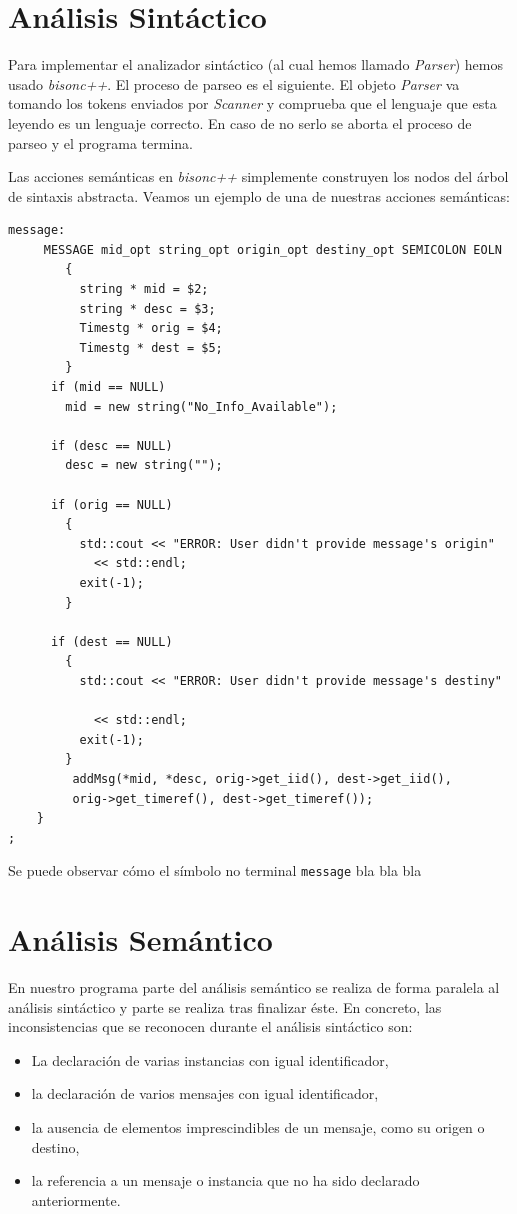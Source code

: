 \section{Análisis Sintáctico}

Para implementar el analizador sintáctico (al cual hemos llamado
\textit{Parser}) hemos usado \textit{bisonc++}. El proceso de parseo
es el siguiente. El objeto \textit{Parser} va tomando los tokens
enviados por \textit{Scanner} y comprueba que el lenguaje que esta
leyendo es un lenguaje correcto. En caso de no serlo se aborta el
proceso de parseo y el programa termina.

Las acciones semánticas en \emph{bisonc++} simplemente construyen los
nodos del árbol de sintaxis abstracta. Veamos un ejemplo de una de
nuestras acciones semánticas: 
\begin{lstlisting}
message:
     MESSAGE mid_opt string_opt origin_opt destiny_opt SEMICOLON EOLN
        { 
	      string * mid = $2;
          string * desc = $3;
          Timestg * orig = $4;
          Timestg * dest = $5;
        }
	  if (mid == NULL)
	    mid = new string("No_Info_Available");

	  if (desc == NULL)
	    desc = new string("");

	  if (orig == NULL)
	    {
	      std::cout << "ERROR: User didn't provide message's origin" 
			<< std::endl;
	      exit(-1);
	    }

	  if (dest == NULL)
	    {
	      std::cout << "ERROR: User didn't provide message's destiny" 

			<< std::endl;
	      exit(-1);
	    }
	     addMsg(*mid, *desc, orig->get_iid(), dest->get_iid(), 
		 orig->get_timeref(), dest->get_timeref());
	}
;
\end{lstlisting}

Se puede observar cómo el símbolo no terminal \lstinline{message} bla bla bla

\section{Análisis Semántico}

En nuestro programa parte del análisis semántico se realiza de forma
paralela al análisis sintáctico y parte se realiza tras finalizar
éste. En concreto, las inconsistencias que se reconocen durante el
análisis sintáctico son:
\begin{itemize}
\item La declaración de varias instancias con igual identificador,
\item la declaración de varios mensajes con igual identificador,
\item la ausencia de elementos imprescindibles de un mensaje, como su
  origen o destino,
\item la referencia a un mensaje o instancia que no ha sido declarado
  anteriormente.
\end{itemize}

